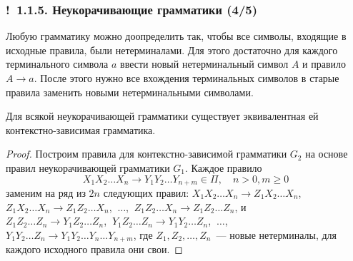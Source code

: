 \documentclass[mathserif,12pt,aspectratio=169]{beamer}
\let\geq\geqslant
\def\Ok{{\color{green}\textbf{!}\ }}
\begin{document}
\begin{frame}
\frametitle{\Ok 1.1.5. Неукорачивающие грамматики (4/5)}

\begin{remark}
Любую грамматику можно доопределить так, 
чтобы все символы, входящие в исходные правила, были нетерминалами.
Для этого достаточно
для каждого терминального символа
$a$ ввести новый нетерминальный символ
$A$ и правило $A\to a$. После этого
нужно все вхождения терминальных
символов
в старые правила заменить 
новыми нетерминальными символами.
\end{remark}



\begin{theorem}
Для всякой неукорачивающей грамматики существует эквивалентная ей \\контекстно-зависимая грамматика.
\end{theorem}

\begin{proof}
Построим правила для контекстно-зависимой
грамматики $G_2$ на основе правил
неукорачивающей грамматики $G_1$.
Каждое правило 
$$X_1 X_2 \ldots X_n \to Y_1 Y_2 \ldots Y_{n+m} \in \Pi,\quad n > 0, m \geq 0$$
заменим на ряд из $2n$ следующих правил:
$X_1 X_2 \dots X_n \rightarrow Z_1 X_2 \dots X_n$,
\\
$Z_1 X_2 \dots X_n \rightarrow Z_1 Z_2 \dots X_n$,
$\ \dots$,
$\ Z_1 Z_2 \dots X_n \rightarrow Z_1 Z_2 \dots Z_n$,
и \\
$Z_1 Z_2 \dots Z_n \rightarrow Y_1 Z_2 \dots Z_n$, $\ Y_1 Z_2 \dots Z_n \rightarrow Y_1 Y_2 \dots Z_n$,
$\ \dots$,\\
$Y_1 Y_2 \dots Z_n \rightarrow Y_1 Y_2 \dots Y_n \dots Y_{n+m}$,
где $Z_1, Z_2, \dots, Z_n$~--- новые нетерминалы, 
для каждого исходного правила они свои.
\end{proof}
\end{frame}
\end{document}
